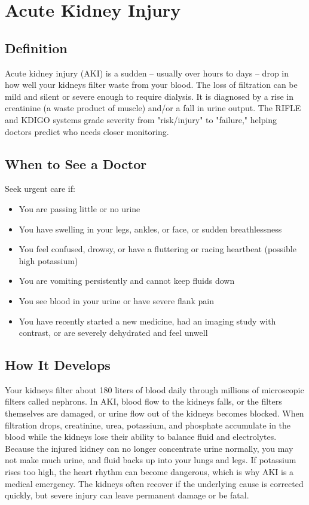 \chapter{Acute Kidney Injury}

\section*{Definition}
Acute kidney injury (AKI) is a sudden -- usually over hours to days -- drop in how well your kidneys filter waste from your blood. The loss of filtration can be mild and silent or severe enough to require dialysis. It is diagnosed by a rise in creatinine (a waste product of muscle) and/or a fall in urine output. The RIFLE and KDIGO systems grade severity from "risk/injury" to "failure," helping doctors predict who needs closer monitoring.

\section*{When to See a Doctor}
Seek urgent care if:
\begin{itemize}
  \item You are passing little or no urine
  \item You have swelling in your legs, ankles, or face, or sudden breathlessness
  \item You feel confused, drowsy, or have a fluttering or racing heartbeat (possible high potassium)
  \item You are vomiting persistently and cannot keep fluids down
  \item You see blood in your urine or have severe flank pain
  \item You have recently started a new medicine, had an imaging study with contrast, or are severely dehydrated and feel unwell
\end{itemize}

\section*{How It Develops}
Your kidneys filter about 180 liters of blood daily through millions of microscopic filters called nephrons. In AKI, blood flow to the kidneys falls, or the filters themselves are damaged, or urine flow out of the kidneys becomes blocked. When filtration drops, creatinine, urea, potassium, and phosphate accumulate in the blood while the kidneys lose their ability to balance fluid and electrolytes. Because the injured kidney can no longer concentrate urine normally, you may not make much urine, and fluid backs up into your lungs and legs. If potassium rises too high, the heart rhythm can become dangerous, which is why AKI is a medical emergency. The kidneys often recover if the underlying cause is corrected quickly, but severe injury can leave permanent damage or be fatal.


